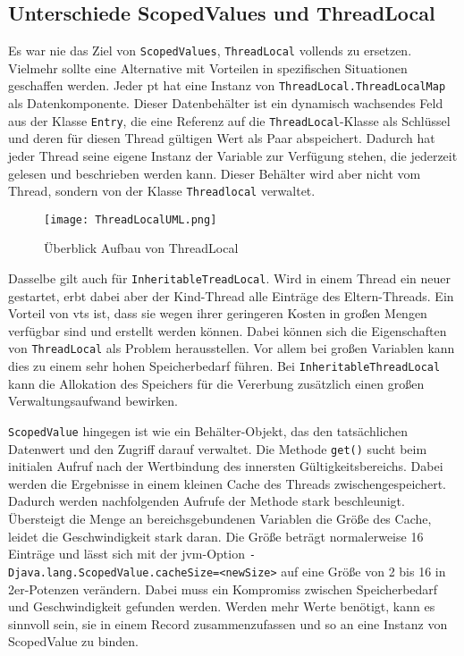 \subsection{Unterschiede ScopedValues und ThreadLocal}
\label{subsec:UnterschiedeScopedValuesundThreadLocal}

    Es war nie das Ziel von \texttt{ScopedValues}, \texttt{ThreadLocal} vollends zu ersetzen. Vielmehr sollte eine Alternative mit Vorteilen in spezifischen Situationen geschaffen werden.
    Jeder \gls{pt} hat eine Instanz von \texttt{ThreadLocal.ThreadLocalMap} als Datenkomponente. Dieser Datenbehälter ist ein dynamisch wachsendes Feld aus
    der Klasse \texttt{Entry}, die eine Referenz auf die \texttt{ThreadLocal}-Klasse als Schlüssel
    und deren für diesen Thread gültigen Wert als Paar abspeichert. Dadurch hat jeder Thread seine eigene Instanz der Variable zur Verfügung stehen, die jederzeit gelesen und beschrieben werden kann.
    Dieser Behälter wird aber nicht vom Thread, sondern von der Klasse \texttt{Threadlocal} verwaltet. 
    \begin{figure}[H]
        \centering
        \texttt{[image: ThreadLocalUML.png]}
        \caption{Überblick Aufbau von ThreadLocal}
        \label{fig:ThreadLocalMap}
    \end{figure}
    Dasselbe gilt auch für \texttt{InheritableTreadLocal}. Wird in einem Thread ein neuer gestartet, erbt dabei aber der Kind-Thread alle Einträge des Eltern-Threads. 
    Ein Vorteil von \Glspl{vt} ist, dass sie wegen ihrer geringeren Kosten in großen Mengen verfügbar sind und erstellt werden können. Dabei können sich die Eigenschaften von \texttt{ThreadLocal}
    als Problem herausstellen. Vor allem bei großen Variablen kann dies zu einem sehr hohen Speicherbedarf führen. Bei \texttt{InheritableThreadLocal} kann die Allokation des Speichers
    für die Vererbung zusätzlich einen großen Verwaltungsaufwand bewirken. 

    \texttt{ScopedValue} hingegen ist wie ein Behälter-Objekt, das den tatsächlichen Datenwert und den Zugriff darauf verwaltet. Die Methode \texttt{get()} sucht beim initialen Aufruf nach
    der Wertbindung des innersten Gültigkeitsbereichs. Dabei werden die Ergebnisse in einem kleinen Cache des Threads zwischengespeichert. Dadurch werden nachfolgenden Aufrufe der
    Methode stark beschleunigt. Übersteigt die Menge an bereichsgebundenen Variablen die Größe des Cache, leidet die Geschwindigkeit stark daran. Die Größe beträgt normalerweise 16 Einträge
    und lässt sich mit der \gls{jvm}-Option \texttt{-Djava.lang.ScopedValue.cacheSize=<newSize>} auf eine Größe von 2 bis 16 in 2er-Potenzen verändern. Dabei muss ein Kompromiss
    zwischen Speicherbedarf und Geschwindigkeit gefunden werden. Werden mehr Werte benötigt, kann es sinnvoll sein, sie in einem Record zusammenzufassen und so an eine Instanz von ScopedValue
    zu binden. 

